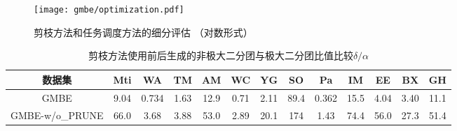 \begin{figure}[t]
	\centering
  \vspace{0.05in}
	\texttt{[image: gmbe/optimization.pdf]}	
	\vspace{0.05in}
  \caption{剪枝方法和任务调度方法的细分评估 （对数形式）}
	\label{fig:gmbe_exp_optimization}
\end{figure}

\begin{table}[t]
  \setlength{\belowcaptionskip}{-0.2cm}
	\centering
	\caption{ 剪枝方法使用前后生成的非极大二分团与极大二分团比值比较$\delta/\alpha$}
	\label{tbl:gmbe_prune}
	\begin{center}
    \setlength{\tabcolsep}{2pt}
		\normalsize
    {
			\begin{tabular}{|c|c|c|c|c|c|c|c|c|c|c|c|c|}
				\hline
        \textbf{数据集} &Mti &WA &TM &AM &WC &YG &SO &Pa &IM &EE &BX &GH \\ \hline
        GMBE &9.04 &0.734 &1.63 &12.9 &0.71 &2.11 &89.4 &0.362 &15.5 &4.04 &3.40 &11.1 \\ 
        GMBE-w/o\_PRUNE &66.0 &3.68 &3.88 &53.0 &2.89 &20.1 &174 &1.43 &74.4 &56.0 &27.3 &51.4 \\ \hline
        

      \end{tabular}
		}
	\end{center}
  \vspace{-0.1in}
\end{table}

